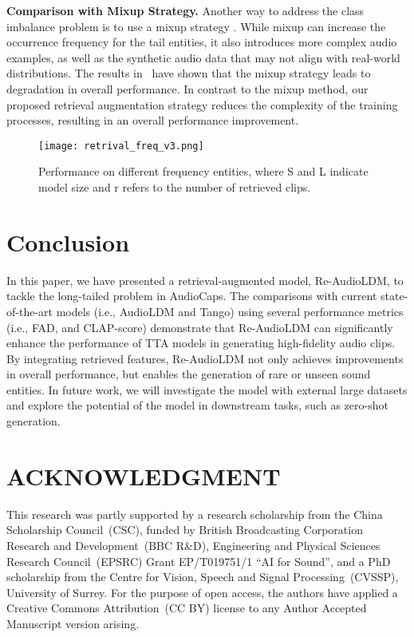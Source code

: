 \documentclass{article}
\begin{document}
\noindent
\textbf{Comparison with Mixup Strategy.}
Another way to address the class imbalance problem is to use a mixup strategy \cite{kong2020panns}. While mixup can increase the occurrence frequency for the tail entities, it also introduces more complex audio examples, as well as the synthetic audio data that may not align with real-world distributions. The results in~\cite{audioldm} have shown that the mixup strategy leads to degradation in overall performance. In contrast to the mixup method, our proposed retrieval augmentation strategy reduces the complexity of the training processes, resulting in an overall performance improvement.

\begin{figure}[htbp]
    \centering
    \texttt{[image: retrival\_freq\_v3.png]}
    \caption{Performance on different frequency entities, where S and L indicate model size and r refers to the number of retrieved clips. }
    \label{fig:retrival-freq}


\end{figure}


\section{Conclusion}
\label{sec:conclusion}
In this paper, we have presented a retrieval-augmented model, Re-AudioLDM, to tackle the long-tailed problem in AudioCaps. The comparisons with current state-of-the-art models (i.e., AudioLDM and Tango) using several performance metrics (i.e., FAD, and CLAP-score) demonstrate that Re-AudioLDM can significantly enhance the performance of TTA models in generating high-fidelity audio clips. By integrating retrieved features, Re-AudioLDM not only achieves improvements in overall performance, but enables the generation of rare or unseen sound entities. In future work, we will investigate the model with external large datasets and explore the potential of the model in downstream tasks, such as zero-shot generation.  


\section{ACKNOWLEDGMENT}
\label{sec:ack}
This research was partly supported by a research scholarship from the China Scholarship Council~(CSC), funded by British Broadcasting Corporation Research and Development~(BBC R\&D), Engineering and Physical Sciences Research Council~(EPSRC) Grant EP/T019751/1 ``AI for Sound'', and a PhD scholarship from the Centre for Vision, Speech and Signal Processing~(CVSSP), University of Surrey. 
For the purpose of open access, the authors have applied a Creative Commons Attribution~(CC BY) license to any Author Accepted Manuscript version arising.

\end{document}
